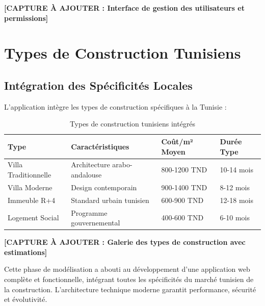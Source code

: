\textbf{[CAPTURE À AJOUTER : Interface de gestion des utilisateurs et permissions]}

\section{Types de Construction Tunisiens}

\subsection{Intégration des Spécificités Locales}

L'application intègre les types de construction spécifiques à la Tunisie :

\begin{table}[h]
\centering
\begin{tabular}{|l|l|l|l|}
\hline
\textbf{Type} & \textbf{Caractéristiques} & \textbf{Coût/m² Moyen} & \textbf{Durée Type} \\
\hline
Villa Traditionnelle & Architecture arabo-andalouse & 800-1200 TND & 10-14 mois \\
\hline
Villa Moderne & Design contemporain & 900-1400 TND & 8-12 mois \\
\hline
Immeuble R+4 & Standard urbain tunisien & 600-900 TND & 12-18 mois \\
\hline
Logement Social & Programme gouvernemental & 400-600 TND & 6-10 mois \\
\hline
\end{tabular}
\caption{Types de construction tunisiens intégrés}
\end{table}

\textbf{[CAPTURE À AJOUTER : Galerie des types de construction avec estimations]}

\begin{resultbox}
Cette phase de modélisation a abouti au développement d'une application web complète et fonctionnelle, intégrant toutes les spécificités du marché tunisien de la construction. L'architecture technique moderne garantit performance, sécurité et évolutivité.
\end{resultbox}
